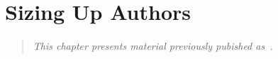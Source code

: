 \chapter{Sizing Up Authors}
\label{ch:contrib}

\begin{quote}
\textit{This chapter presents material previously pubished
as~\cite{Adler2008a}.}
\end{quote}









